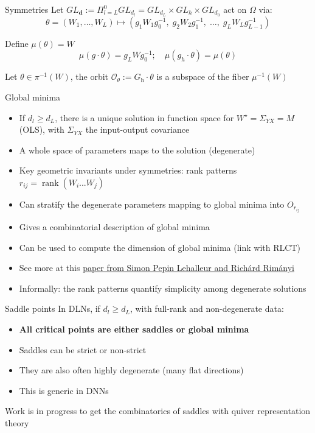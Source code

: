 \documentclass[aspectratio=169]{beamer}
\begin{document}
\begin{frame}{Symmetries}
  \small
  Let $GL_{\textbf{d}}:=\Pi_{l=L}^0 GL_{d_l} = GL_{d_L}\times GL_{h} \times GL_{d_0}$ act on $\Omega$ via:
  \[
    \theta=(W_1,\dots,W_L)\mapsto
    (g_1W_1g_0^{-1},\; g_2W_2g_1^{-1},\;\dots,\; g_L W_L g_{L-1}^{-1})
  \]

  Define $\mu(\theta) = W$
  \[
    \mu(g\cdot \theta)=g_LWg_0^{-1};\quad \mu(g_h\cdot \theta) = \mu(\theta)
  \]

  Let $\theta\in \pi^{-1}(W)$, the orbit $\mathcal{O}_{\theta}:=G_{\mathrm{h}}\cdot \theta$ is a subspace of the fiber $\mu^{-1}(W)$
\end{frame}

\begin{frame}{Global minima}
  \small
  \begin{itemize}
    \item If $d_l \geq d_L$, there is a unique solution in function space for $W^{\star} = \Sigma_{YX}=M$ (OLS), with $\Sigma_{YX}$ the input-output covariance
    \item A whole space of parameters maps to the solution (degenerate)
    \item Key geometric invariants under symmetries: rank patterns $r_{ij}=\operatorname{rank}(W_i...W_j)$
    \item Can stratify the degenerate parameters mapping to global minima into $O_{r_{ij}}$
    \item Gives a combinatorial description of global minima
    \item Can be used to compute the dimension of global minima (link with RLCT)
    \item See more at this \href{https://arxiv.org/abs/2411.19920}{paper from Simon Pepin Lehalleur and Rich{\'a}rd Rim{\'a}nyi}
    \item Informally: the rank patterns quantify simplicity among degenerate solutions
  \end{itemize}
\end{frame}

\begin{frame}{Saddle points}
  In DLNs, if $d_l \geq d_L$, with full-rank and non-degenerate data:
  \begin{itemize}
    \item \textbf{All critical points are either saddles or global minima}
    \item Saddles can be strict or non-strict
    \item They are also often highly degenerate (many flat directions)
    \item This is generic in DNNs
  \end{itemize}

  Work is in progress to get the combinatorics of saddles with quiver representation theory
\end{frame}
\end{document}
